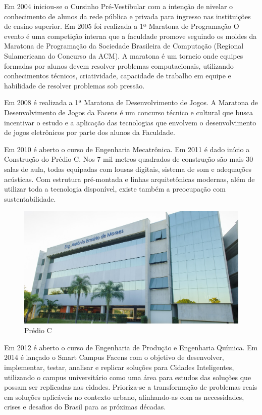 \documentclass[
	12pt,				%
	oneside,			%
	a4paper,			%
	chapter=TITLE,		%
	section=TITLE,		%
	sumario=tradicional %
	english,			%
	french,				%
	spanish,			%
	brazil				%
	]{abntex2}
\begin{document}
Em 2004 iniciou-se o Cursinho Pré-Vestibular com a intenção de nivelar o conhecimento de alunos da rede pública e privada para ingresso nas instituições de ensino superior. Em 2005 foi realizada a 1ª Maratona de Programação O evento é uma competição interna que a faculdade promove seguindo os moldes da Maratona de Programação da Sociedade Brasileira de Computação (Regional Sulamericana do Concurso da ACM). A maratona é um torneio onde equipes formadas por alunos devem resolver problemas computacionais, utilizando conhecimentos técnicos, criatividade, capacidade de trabalho em equipe e habilidade de resolver problemas sob pressão.

Em 2008 é realizada a 1ª Maratona de Desenvolvimento de Jogos. A Maratona de Desenvolvimento de Jogos da Facens é um concurso técnico e cultural que busca incentivar o estudo e a aplicação das tecnologias que envolvem o desenvolvimento de jogos eletrônicos por parte dos alunos da Faculdade.

Em 2010 é aberto o curso de Engenharia Mecatrônica. Em 2011 é dado início a Construção do Prédio C. Nos 7 mil metros quadrados de construção são mais 30 salas de aula, todas equipadas com lousas digitais, sistema de som e adequações acústicas. Com estrutura pré-montada e linhas arquitetônicas modernas, além de utilizar toda a tecnologia disponível, existe também a preocupação com sustentabilidade.

\begin{figure}[htb]
	\caption{\label{fig:predioc} Prédio C}
	\begin{center}
		\includegraphics[scale=0.3]{predioc}
	\end{center}
\end{figure}

Em 2012 é aberto o curso de Engenharia de Produção e Engenharia Química. Em 2014 é lançado o Smart Campus Facens com o objetivo de  desenvolver, implementar, testar, analisar e replicar soluções para Cidades Inteligentes, utilizando o campus universitário como uma área para estudos das soluções que possam ser replicadas nas cidades. Prioriza-se a transformação de problemas reais em soluções aplicáveis no contexto urbano, alinhando-as com as necessidades, crises e desafios do Brasil para as próximas décadas. 
\end{document}
